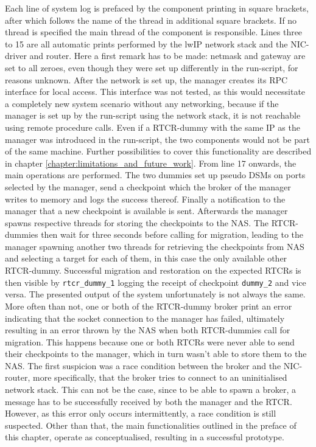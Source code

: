 Each line of system log is prefaced by the component printing in square brackets, after which follows the name of the thread in additional square brackets. If no thread is specified the main thread of the component is responsible. Lines three to 15 are all automatic prints performed by the lwIP network stack and the NIC-driver and router. Here a first remark has to be made: netmask and gateway are set to all zeroes, even though they were set up differently in the run-script, for reasons unknown. After the network is set up, the manager creates its RPC interface for local access. This interface was not tested, as this would necessitate a completely new system scenario without any networking, because if the manager is set up by the run-script using the network stack, it is not reachable using remote procedure calls. Even if a RTCR-dummy with the same IP as the manager was introduced in the run-script, the two components would not be part of the same machine. Further possibilities to cover this functionality are described in chapter \ref{chapter:limitations_and_future_work}. From line 17 onwards, the main operations are performed. The two dummies set up pseudo DSMs on ports selected by the manager, send a checkpoint which the broker of the manager writes to memory and logs the success thereof. Finally a notification to the manager that a new checkpoint is available is sent. Afterwards the manager spawns respective threads for storing the checkpoints to the NAS. The RTCR-dummies then wait for three seconds before calling for migration, leading to the manager spawning another two threads for retrieving the checkpoints from NAS and selecting a target for each of them, in this case the only available other RTCR-dummy. Successful migration and restoration on the expected RTCRs is then visible by \verb|rtcr_dummy_1| logging the receipt of checkpoint \verb|dummy_2| and vice versa. 
The presented output of the system unfortunately is not always the same. More often than not, one or both of the RTCR-dummy broker print an error indicating that the socket connection to the manager has failed, ultimately resulting in an error thrown by the NAS when both RTCR-dummies call for migration. This happens because one or both RTCRs were never able to send their checkpoints to the manager, which in turn wasn't able to store them to the NAS. The first suspicion was a race condition between the broker and the NIC-router, more specifically, that the broker tries to connect to an uninitialised network stack. This can not be the case, since to be able to spawn a broker, a message has to be successfully received by both the manager and the RTCR. However, as this error only occurs intermittently, a race condition is still suspected.
\newline \newline
Other than that, the main functionalities outlined in the preface of this chapter, operate as conceptualised, resulting in a successful prototype.
